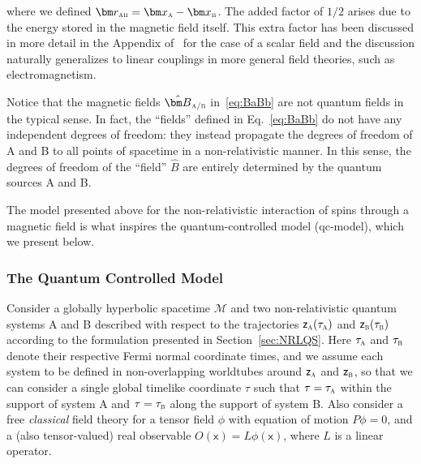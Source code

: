 \documentclass[letterpaper,12pt,titlepage,oneside,final]{book}
\newcommand{\M}{\mathcal{M}}
\newcommand{\mf}{\mathsf}%
\newcommand{\tc}[1]{\textsc{#1}}
\begin{document}
    where we defined $\bm r_\tc{ab} = \bm x_\tc{a} - \bm x_\tc{b}$. The added factor of $1/2$ arises due to the energy stored in the magnetic field itself. This extra factor has been discussed in more detail in the Appendix of~\cite{eirini} for the case of a scalar field and the discussion naturally generalizes to linear couplings in more general field theories, such as electromagnetism.
    
    Notice that the magnetic fields $\hat{\bm B}_\tc{a/b}$ in~\eqref{eq:BaBb} are not quantum fields in the typical sense. In fact, the ``fields'' defined in Eq.~\eqref{eq:BaBb} do not have any independent degrees of freedom: they instead propagate the degrees of freedom of A and B to all points of spacetime in a non-relativistic manner. In this sense, the degrees of freedom of the ``field'' $\hat{B}$ are entirely determined by the quantum sources A and B. 

    The model presented above for the non-relativistic interaction of spins through a magnetic field is what inspires the quantum-controlled model (qc-model), which we present below.




\subsubsection*{The Quantum Controlled Model}

Consider a globally hyperbolic spacetime $\M$ and two non-relativistic quantum systems A and B described with respect to the trajectories $\mf z_\tc{a}(\tau_\tc{a})$ and $\mf z_\tc{b}(\tau_\tc{b})$ according to the formulation presented in Section~\ref{sec:NRLQS}. Here $\tau_\tc{a}$ and $\tau_\tc{b}$ denote their respective Fermi normal coordinate times, and we assume each system to be defined in non-overlapping worldtubes around $\mf z_\tc{a}$ and $\mf z_\tc{b}$, so that we can consider a single global timelike coordinate $\tau$ such that $\tau = \tau_\tc{a}$ within the support of system A and $\tau = \tau_\tc{b}$ along the support of system B. Also consider a free \textit{classical} field theory for a tensor field $\phi$ with equation of motion $P\phi = 0$, and a (also tensor-valued) real observable $O(\mf x) = L\phi(\mf x)$, where $L$ is a linear operator. 
\end{document}
